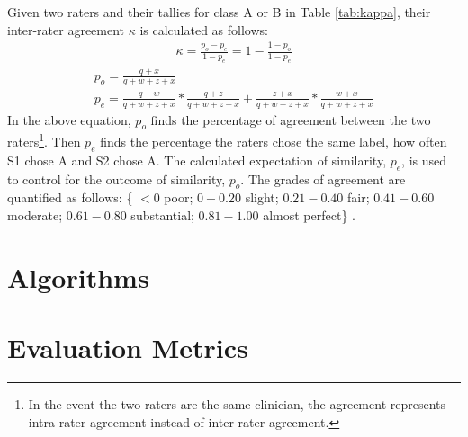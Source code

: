 Given two raters and their tallies for class A or B in Table \ref{tab:kappa}, their inter-rater agreement $\kappa$ is calculated as follows:
\begin{gather}
\kappa = \frac{p_{o}-p_{e}}{1-p_{e}} = 1 - \frac{1-p_{o}}{1-p_{e}}
\end{gather}
\begin{gather}
p_{o} = \frac{q+x}{q+w+z+x} \nonumber \\
p_{e} =  \frac{q+w}{q+w+z+x}*\frac{q+z}{q+w+z+x}+\frac{z+x}{q+w+z+x}*\frac{w+x}{q+w+z+x}
\end{gather}
In the above equation, $p_{o}$ finds the percentage of agreement between the two raters\footnote{In the event the two raters are the same clinician, the agreement represents intra-rater agreement instead of inter-rater agreement.}. Then $p_{e}$ finds the percentage the raters chose the same label, how often S1 chose A and S2 chose A. The calculated expectation of similarity, $p_{e}$, is used to control for the outcome of similarity, $p_{o}$. The grades of agreement are quantified as follows: \{ $<0$ poor; $0-0.20$ slight; $0.21-0.40$ fair; $0.41-0.60$ moderate; $0.61-0.80$ substantial; $0.81-1.00$ almost perfect\} \cite{Landis2008}.

\section{Algorithms}

\section{Evaluation Metrics}
